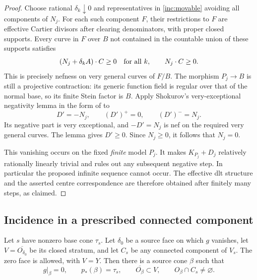 \begin{proof}
Choose rational $\delta_k\downarrow0$ and representatives in
\eqref{inc:movable} avoiding all components of $N_j$.  For each such
component $F$, their restrictions to $F$ are effective Cartier
divisors after clearing denominators, with proper closed supports.
Every curve in $F$ over $B$ not contained in the countable union of
these supports satisfies
\[
 (N_j+\delta_k A)\cdot C\geq0\quad\hbox{for all }k,
 \qquad N_j\cdot C\geq0.
\]
This is precisely nefness on very general curves of $F/B$.
The morphism $P_j\to B$ is still a projective contraction: its
generic function field is regular over that of the normal base,
so its finite Stein factor is $B$.  Apply Shokurov's very-exceptional
negativity lemma in the form of \cite[Lemma~3.3]{BirkarFlips} to
\[
 D'=-N_j,\qquad (D')^+=0,\qquad (D')^-=N_j.
\]
Its negative part is very exceptional, and $-D'=N_j$ is nef on
the required very general curves.  The lemma gives $D'\geq0$.
Since $N_j\geq0$, it follows that $N_j=0$.

This vanishing occurs on the fixed \emph{finite} model $P_j$.
It makes $K_{P_j}+D_j$ relatively rationally linearly trivial and
rules out any subsequent negative step.  In particular the proposed
infinite sequence cannot occur.  The effective dlt structure and
the asserted centre correspondence are therefore obtained after
finitely many steps, as claimed.
\end{proof}

\subsection{Incidence in a prescribed connected component}

\begin{proposition}[Lc incidence]\label{prop:lc-incidence}
Let $s$ have nonzero base cone $\tau_s$.  Let $\delta_0$ be a source
face on which $g$ vanishes, let $V=\overline{O_{\delta_0}}$ be its
closed stratum, and let $C_s$ be any connected component of $V_s$.
The zero face is allowed, with $V=Y$.  Then there is a source cone
$\beta$ such that
\[
 g|_\beta=0,\qquad p_*(\beta)=\tau_s,\qquad
 \overline{O_\beta}\subset V,\qquad O_\beta\cap C_s\ne\varnothing.
\]
\end{proposition}

